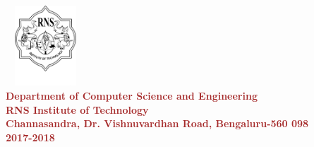 \begin{titlepage}
\begin{center}
\includegraphics[width=3cm, height=3cm]{./RNS_logo.png}\\[0.1in]

\textup{\normalsize {\textcolor{brown}{\bf Department of Computer Science and Engineering} \\ {\textcolor{brown}{\bf \bf{RNS Institute of Technology}}}}}\\
\textup{\small {\textcolor{brown}{\bf Channasandra, Dr. Vishnuvardhan Road, Bengaluru-560 098}\\ \textbf {\textcolor{brown}{2017-2018}}}}
\end{center}
\end{titlepage}
